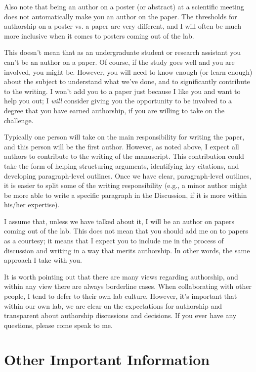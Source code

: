 \documentclass[letterpaper,12pt,oneside]{memoir}
\begin{document}
Also note that being an author on a poster (or abstract) at a scientific meeting does not automatically make you an author on the paper. The thresholds for authorship on a poster vs. a paper are very different, and I will often be much more inclusive when it comes to posters coming out of the lab.

This doesn't mean that as an undergraduate student or research assistant you can't be an author on a paper. Of course, if the study goes well and you are involved, you might be. However, you will need to know enough (or learn enough) about the subject to understand what we've done, and to significantly contribute to the writing. I won't add you to a paper just because I like you and want to help you out; I {\itshape will} consider giving you the opportunity to be involved to a degree that you have earned authorship, if you are willing to take on the challenge.

Typically one person will take on the main responsibility for writing the paper, and this person will be the first author. However, as noted above, I expect all authors to contribute to the writing of the manuscript. This contribution could take the form of helping structuring arguments, identifying key citations, and developing paragraph-level outlines. Once we have clear, paragraph-level outlines, it is easier to split some of the writing responsibility (e.g., a minor author might be more able to write a specific paragraph in the Discussion, if it is more within his/her expertise).

I assume that, unless we have talked about it, I will be an author on papers coming out of the lab. This does not mean that you should add me on to papers as a courtesy; it means that I expect you to include me in the process of discussion and writing in a way that merits authorship. In other words, the same approach I take with you.

It is worth pointing out that there are many views regarding authorship, and within any view there are always borderline cases. When collaborating with other people, I tend to defer to their own lab culture. However, it's important that within our own lab, we are clear on the expectations for authorship and transparent about authorship discussions and decisions. If you ever have any questions, please come speak to me.


\chapter{Other Important Information}
\end{document}
